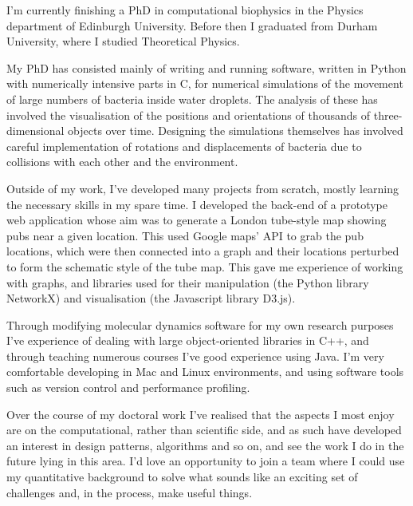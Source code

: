 I'm currently finishing a PhD in computational biophysics in the Physics department of Edinburgh University. Before then I graduated from Durham University, where I studied Theoretical Physics.

My PhD has consisted mainly of writing and running software, written in Python with numerically intensive parts in C, for numerical simulations of the movement of large numbers of bacteria inside water droplets. The analysis of these has involved the visualisation of the positions and orientations of thousands of three-dimensional objects over time. Designing the simulations themselves has involved careful implementation of rotations and displacements of bacteria due to collisions with each other and the environment.

Outside of my work, I've developed many projects from scratch, mostly learning the necessary skills in my spare time. I developed the back-end of a prototype web application whose aim was to generate a London tube-style map showing pubs near a given location. This used Google maps' API to grab the pub locations, which were then connected into a graph and their locations perturbed to form the schematic style of the tube map. This gave me experience of working with graphs, and libraries used for their manipulation (the Python library NetworkX) and visualisation (the Javascript library D3.js).

Through modifying molecular dynamics software for my own research purposes I've experience of dealing with large object-oriented libraries in C++, and through teaching numerous courses I've good experience using Java. I'm very comfortable developing in Mac and Linux environments, and using software tools such as version control and performance profiling.

Over the course of my doctoral work I've realised that the aspects I most enjoy are on the computational, rather than scientific side, and as such have developed an interest in design patterns, algorithms and so on, and see the work I do in the future lying in this area. I'd love an opportunity to join a team where I could use my quantitative background to solve what sounds like an exciting set of challenges and, in the process, make useful things.
